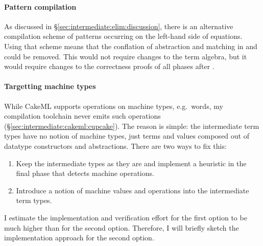 \paragraph{Pattern compilation}
As discussed in §\ref{sec:intermediate:elim:discussion}, there is an alternative compilation scheme of patterns occurring on the left-hand side of equations.
Using that scheme means that the conflation of abstraction and matching in  and  could be removed.
This would not require changes to the term algebra, but it would require changes to the correctness proofs of all phases after .

\paragraph{Targetting machine types}
While CakeML supports operations on machine types, e.g.\ words, my compilation toolchain never emits such operations (§\ref{sec:intermediate:cakeml:cupcake}).
The reason is simple: the intermediate term types have no notion of machine types, just terms and values composed out of datatype constructors and abstractions.
There are two ways to fix this:

\begin{enumerate}
  \item Keep the intermediate types as they are and implement a heuristic in the final phase that detects machine operations.
  \item Introduce a notion of machine values and operations into the intermediate term types.
\end{enumerate}

\noindent
I estimate the implementation and verification effort for the first option to be much higher than for the second option.
Therefore, I will briefly sketch the implementation approach for the second option.

